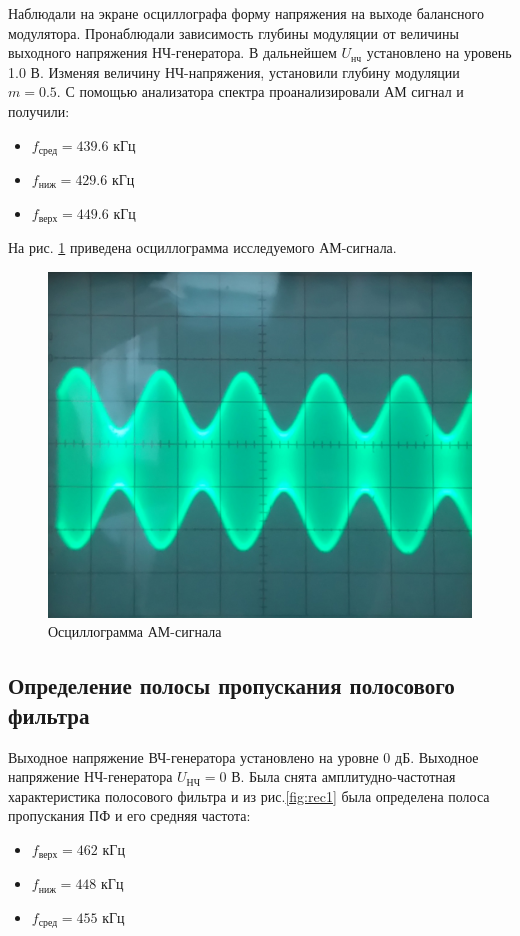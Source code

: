 Наблюдали на экране осциллографа форму напряжения на выходе балансного модулятора. Пронаблюдали зависимость глубины модуляции от величины выходного напряжения НЧ-генератора.
В дальнейшем $U_{\text{нч}}$ установлено на уровень 1.0 В. Изменяя величину НЧ-напряжения, установили глубину модуляции $m=0.5$. С помощью анализатора спектра проанализировали АМ сигнал и получили:

\begin{itemize}
	\item $f_{\text{сред}}=439.6$ кГц
	\item $f_{\text{ниж}}=429.6$ кГц
	\item $f_{\text{верх}}=449.6$ кГц
\end{itemize}
На рис. \ref{fig:rec2} приведена осциллограмма исследуемого АМ-сигнала.

\begin{figure}[H]
	\centering
	\includegraphics[width=0.7\linewidth]{img/img1}
	\caption{Осциллограмма АМ-сигнала}
	\label{fig:rec2}
\end{figure}


\subsection{Определение полосы пропускания полосового фильтра}
Выходное напряжение ВЧ-генератора установлено на уровне 0 дБ. Выходное напряжение НЧ-генератора $U_{\text{НЧ}}=0$ В.
Была снята амплитудно-частотная характеристика полосового фильтра и из рис.\ref{fig:rec1} была определена полоса пропускания ПФ и его средняя частота:

\begin{itemize}
	\item $f_{\text{верх}}=462$ кГц
	\item $f_{\text{ниж}}=448$ кГц
	\item $f_{\text{сред}}=455$ кГц
\end{itemize}

